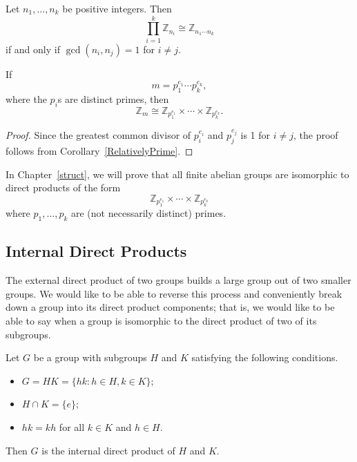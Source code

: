 \begin{corollary}\label{RelativelyPrime}
Let $n_1, \ldots, n_k$ be positive integers. Then
\[
\prod_{i=1}^k {\mathbb Z}_{n_i} \cong {\mathbb Z}_{n_1 \cdots n_k}
\]
if and only if $\gcd( n_i, n_j) =1$ for $i \neq j$.
\end{corollary}

 
\begin{corollary}
If
\[
m = p_1^{e_1} \cdots  p_k^{e_k},
\]
where the $p_i$s are distinct primes, then
\[
{\mathbb Z}_m \cong {\mathbb Z}_{p_1^{e_1}} \times \cdots \times {\mathbb
Z}_{p_k^{e_k}}.
\]
\end{corollary}
 
 
\begin{proof}
Since the greatest common divisor of $p_i^{e_i}$ and $p_j^{e_j}$ is
1 for $i \neq j$, the proof follows from Corollary~\ref{RelativelyPrime}.
\end{proof}


\medskip


In Chapter~\ref{struct}, we will prove that all finite abelian groups are %
isomorphic to direct products of
the form
\[
{\mathbb Z}_{p_1^{e_1}} \times \cdots \times {\mathbb
Z}_{p_k^{e_k}}
\]
where $p_1, \ldots, p_k$ are (not necessarily distinct) primes.

 
 
\subsection*{Internal Direct Products}
 

The external direct product of two groups builds a large group out of
two smaller groups.   We would like to be able to reverse this process
and conveniently break down a group into its direct product
components; that is, we would like to be able to say when a group is
isomorphic to the direct product of two of its subgroups.
 

Let $G$ be a group with subgroups $H$ and $K$ satisfying the following
conditions.
\begin{itemize}
 
\item
$G = HK = \{ hk : h \in H, k \in K  \}$;
 
\item
$H \cap K = \{ e \}$;
 
\item
$hk = kh$ for all $k \in K$ and $h \in H$.
 
\end{itemize}
Then $G$ is the {\bfi internal direct product\/} of $H$ and $K$.

